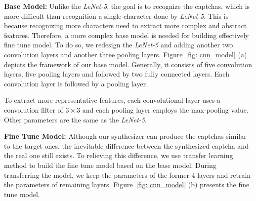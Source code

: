 \noindent \textbf{Base Model:}
Unlike the \emph{LeNet-5}, the goal is to recognize the captchas, which is more difficult than recognition a single character done by \emph{LeNet-5}. This is because recognizing more characters need to extract more complex and abstract features. Therefore, a more complex base model is needed for building effectively fine tune model.
To do so, we redesign the \emph{LeNet-5} and adding another two convolution layers and another three pooling layers.
Figure~\ref{fig: cnn_model} (a) depicts the framework of our base model. Generally, it consists of five convolution layers, five pooling layers and followed by two fully connected layers. Each convolution layer is followed by a pooling layer.

To extract more representative features, each convolutional layer uses a convolution filter of $3 \times 3$ and each pooling layer employs the max-pooling value. Other parameters are the same as the \emph{LeNet-5}.

\noindent \textbf{Fine Tune Model:}
Although our synthesizer can produce the captchas similar to the target ones, the inevitable difference between the synthesized captcha and the real one still exists. To relieving this difference, we use transfer learning method to build the fine tune model based on the base model. During transferring the model, we keep the parameters of the former 4 layers and retrain the parameters of remaining layers. Figure~\ref{fig: cnn_model} (b) presents the fine tune model.










